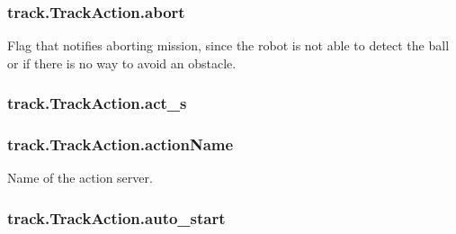\subsubsection[{\texorpdfstring{abort}{abort}}]{\setlength{\rightskip}{0pt plus 5cm}track.\+Track\+Action.\+abort\hspace{0.3cm}{\ttfamily [static]}}\hypertarget{classtrack_1_1TrackAction_a4fac0918d826dc6cbf110784c8fcda99}{}\label{classtrack_1_1TrackAction_a4fac0918d826dc6cbf110784c8fcda99}


Flag that notifies aborting mission, since the robot is not able to detect the ball or if there is no way to avoid an obstacle. 

\subsubsection[{\texorpdfstring{act\+\_\+s}{act_s}}]{\setlength{\rightskip}{0pt plus 5cm}track.\+Track\+Action.\+act\+\_\+s\hspace{0.3cm}{\ttfamily [static]}}\hypertarget{classtrack_1_1TrackAction_ae1870a4393e99629a3835f563374152e}{}\label{classtrack_1_1TrackAction_ae1870a4393e99629a3835f563374152e}
\subsubsection[{\texorpdfstring{action\+Name}{actionName}}]{\setlength{\rightskip}{0pt plus 5cm}track.\+Track\+Action.\+action\+Name\hspace{0.3cm}{\ttfamily [static]}}\hypertarget{classtrack_1_1TrackAction_abb57579f14aa39d1cc0f4379382390a6}{}\label{classtrack_1_1TrackAction_abb57579f14aa39d1cc0f4379382390a6}


Name of the action server. 

\subsubsection[{\texorpdfstring{auto\+\_\+start}{auto_start}}]{\setlength{\rightskip}{0pt plus 5cm}track.\+Track\+Action.\+auto\+\_\+start\hspace{0.3cm}{\ttfamily [static]}}\hypertarget{classtrack_1_1TrackAction_aeb30f796983b2999ad62d71535795668}{}\label{classtrack_1_1TrackAction_aeb30f796983b2999ad62d71535795668}
